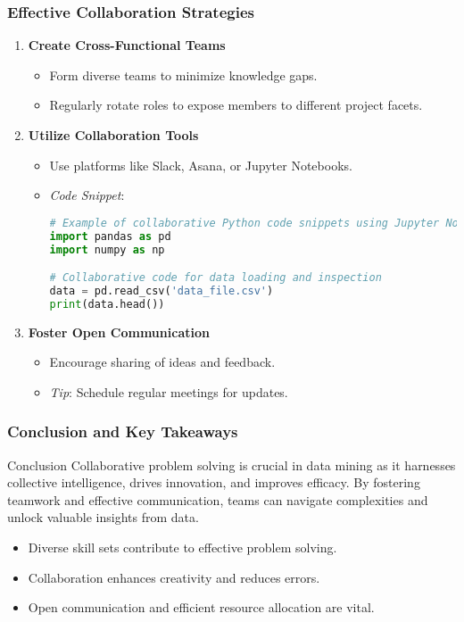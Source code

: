 \documentclass{beamer}
\begin{document}
\begin{frame}[fragile]
    \frametitle{Effective Collaboration Strategies}
    \begin{enumerate}
        \item \textbf{Create Cross-Functional Teams}
            \begin{itemize}
                \item Form diverse teams to minimize knowledge gaps.
                \item Regularly rotate roles to expose members to different project facets.
            \end{itemize}
        \item \textbf{Utilize Collaboration Tools}
            \begin{itemize}
                \item Use platforms like Slack, Asana, or Jupyter Notebooks.
                \item \textit{Code Snippet}:
                \begin{lstlisting}[language=Python]
# Example of collaborative Python code snippets using Jupyter Notebooks
import pandas as pd
import numpy as np

# Collaborative code for data loading and inspection
data = pd.read_csv('data_file.csv')
print(data.head())
                \end{lstlisting}
            \end{itemize}
        \item \textbf{Foster Open Communication}
            \begin{itemize}
                \item Encourage sharing of ideas and feedback.
                \item \textit{Tip}: Schedule regular meetings for updates.
            \end{itemize}
    \end{enumerate}
\end{frame}

\begin{frame}[fragile]
    \frametitle{Conclusion and Key Takeaways}
    \begin{block}{Conclusion}
        Collaborative problem solving is crucial in data mining as it harnesses collective intelligence, drives innovation, and improves efficacy. By fostering teamwork and effective communication, teams can navigate complexities and unlock valuable insights from data.
    \end{block}
    
    \begin{itemize}
        \item Diverse skill sets contribute to effective problem solving.
        \item Collaboration enhances creativity and reduces errors.
        \item Open communication and efficient resource allocation are vital.
    \end{itemize}
\end{frame}
\end{document}
